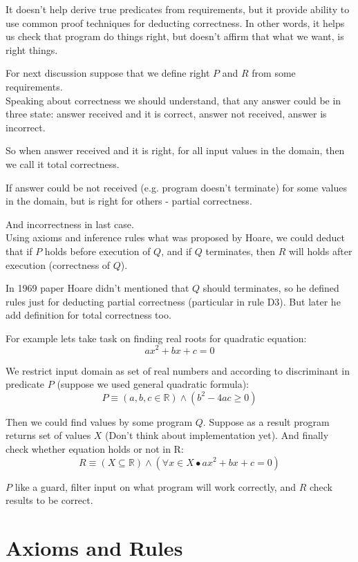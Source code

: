 \documentclass[twoside,twocolumn]{article}
\begin{document}
It doesn't help derive true predicates from requirements, but it
provide ability to use common proof techniques for deducting correctness.
In other words, it helps us check that program do things right, but doesn't
affirm that what we want, is right things.

For next discussion suppose that we define right $P$ and $R$ from some
requirements. \\

Speaking about correctness we should understand, that any answer could be in
three state: answer received and it is correct, answer not received, answer is
incorrect.  

So when answer received and it is right, for all input values in the domain,
then we call it total correctness.

If answer could be not received (e.g. program doesn't terminate) for some values
in the domain, but is right for others - partial correctness.

And incorrectness in last case. \\

Using axioms and inference rules what was proposed by Hoare, we could deduct
that if $P$ holds before execution of $Q$, and if $Q$ terminates, then $R$ will
holds after execution (correctness of $Q$).

In 1969 paper Hoare didn't mentioned that $Q$ should terminates, so he defined
rules just for deducting partial correctness (particular in rule D3). But later
he add definition for total correctness too.

For example lets take task on finding real roots for quadratic equation:
$$ ax^2 + bx + c = 0$$

We restrict input domain as set of real numbers and according to discriminant in
predicate $P$ (suppose we used general quadratic formula):
$$ P \equiv (a, b, c \in \mathbb{R}) \wedge (b^2 - 4ac \geq 0)$$

Then we could find values by some program $Q$. Suppose as a result program
returns set of values $X$ (Don't think about implementation yet).
And finally check whether equation holds or not in R: 
$$ R \equiv (X \subseteq \mathbb{R}) \wedge (\forall x \in X \bullet ax^2 + bx + c
= 0)$$

$P$ like a guard, filter input on what program will work correctly, and $R$
check results to be correct. 


\section{Axioms and Rules}
\end{document}
